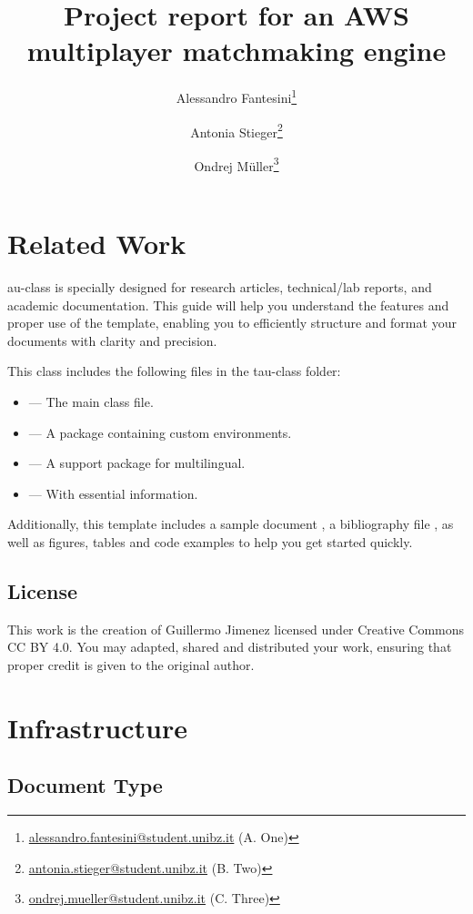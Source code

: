 \documentclass[9pt,a4paper,twocolumn,twoside]{tau-class/tau}
\title{Project report for an AWS multiplayer matchmaking engine}
\author[a,1]{Alessandro Fantesini\thanks{\href{mailto:alessandro.fantesini@student.unibz.it}{alessandro.fantesini@student.unibz.it} (A. One)}}
\author[b,2]{Antonia Stieger\thanks{\href{mailto:antonia.stieger@student.unibz.it}{antonia.stieger@student.unibz.it} (B. Two)}}
\author[c,3]{Ondrej M\"uller\thanks{\href{mailto:ondrej.mueller@student.unibz.it}{ondrej.mueller@student.unibz.it} (C. Three)}}
\affil[a]{Free University of Bozen-Bolzano, Italy}
\affil[b]{Free University of Bozen-Bolzano, Italy}
\affil[c]{Free University of Bozen-Bolzano, Italy}
\begin{document}
		
    \maketitle 
    \thispagestyle{firststyle}
    

\section{Related Work}

    au-class is specially designed for research articles, technical/lab reports, and academic documentation. This guide will help you understand the features and proper use of the template, enabling you to efficiently structure and format your documents with clarity and precision.

    This class includes the following files in the tau-class folder:
	
	\begin{itemize}
		\item {} — The main class file.
		\item {} — A package containing custom environments.
		\item {} — A support package for multilingual.
		\item {} — With essential information.
	\end{itemize}

    Additionally, this template includes a sample document , a bibliography file , as well as figures, tables and code examples to help you get started quickly.

    \subsection{License}
    
        This work is the creation of Guillermo Jimenez licensed under Creative Commons CC BY 4.0. You may adapted, shared and distributed your work, ensuring that proper credit is given to the original author.

\section{Infrastructure}

    \subsection{Document Type}
\end{document}
